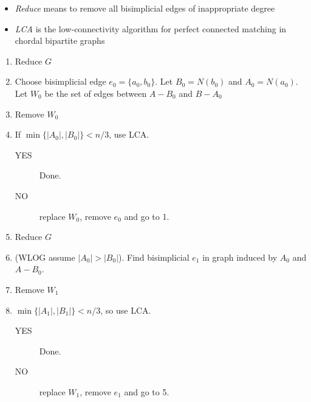 \documentclass[12pt]{article}
\begin{document}
\begin{itemize}
	\item {\it Reduce} means to remove all bisimplicial edges of inappropriate degree
	\item {\it LCA} is the low-connectivity algorithm for perfect connected matching in chordal bipartite graphs
\end{itemize}
\begin{enumerate}
	\item Reduce $G$
	\item Choose  bisimplicial edge $e_0 = \{a_0, b_0\}$.  Let $B_0 = N(b_0)$ and $A_0 = N(a_0)$. Let $W_0$ be the set of edges between $A-B_0$ and $B-A_0$
	\item Remove $W_0$
	\item If $\min \{|A_0|, |B_0|\} < n/3$, use LCA. 
		\begin{description}
			\item[YES] Done. 
			\item[NO] replace $W_0$, remove $e_0$ and go to 1. 
		\end{description}
	\item  Reduce $G$
	\item (WLOG assume $|A_0| > |B_0|$).  Find bisimplicial $e_1$ in graph induced by $A_0$ and $A-B_0$. 
	\item Remove $W_1$ 
	\item $\min \{|A_1|, |B_1|\} < n/3$, so use LCA. 
		\begin{description}
			\item[YES] Done. 
			\item[NO] replace $W_1$, remove $e_1$ and go to 5. 
		\end{description}
	
\end{enumerate}
\end{document}
